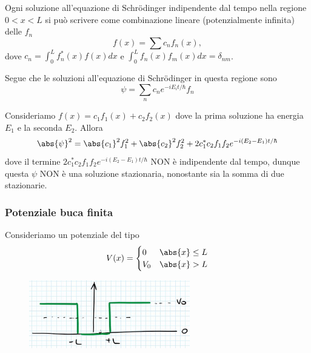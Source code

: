 \begin{fact}
Ogni soluzione all'equazione di Schr\"odinger indipendente dal tempo nella regione $0<x<L$ si pu\`o scrivere come combinazione lineare (potenzialmente infinita) delle $f_n$
\[f(x)=\sum c_n f_n(x),\]
dove $c_n=\int_0^L f_n^\ast(x) f(x)dx$ e $\int_0^L f_n(x)f_m(x)dx=\delta_{nm}$.\bigskip

\noindent Segue che le soluzioni all'equazione di Schr\"odinger in questa regione sono
\[\psi=\sum_n c_n e^{-iE_i t/\hbar} f_n\]
\end{fact}

\begin{example}
Consideriamo $f(x)=c_1f_1(x)+c_2f_2(x)$ dove la prima soluzione ha energia $E_1$ e la seconda $E_2$. Allora
\[\abs{\psi}^2=\abs{c_1}^2 f_1^2+\abs{c_2}^2 f_2^2+2c_1^\ast c_2 f_1f_2 e^{-i(E_2-E_1)t/\hbar}\]
dove il termine $2c_1^\ast c_2 f_1f_2 e^{-i(E_2-E_1)t/\hbar}$ NON \`e indipendente dal tempo, dunque questa $\psi$ NON \`e una soluzione stazionaria, nonostante sia la somma di due stazionarie.
\end{example}



\subsubsection{Potenziale buca finita}
Consideriamo un potenziale del tipo
\[V(x)=\begin{cases}
0 &\abs{x}\leq L\\
V_0 &\abs{x}>L
\end{cases}\]

\begin{figure}[!htb]
    \centering
    \includegraphics[width=7cm]{images/buca_finita.png}
\end{figure}

